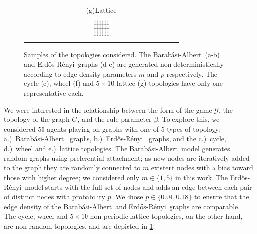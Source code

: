 \documentclass[letterpaper]{article}
\newcommand{\BA}{Barab\'{a}si-Albert~}
\newcommand{\BAbox}{\mbox{\BA}}
\newcommand{\ER}{Erd\H{o}s-R\'{e}nyi~}
\newcommand{\ERbox}{\mbox{\ER}}
\begin{document}
\begin{figure}[!h]
\begin{tabular}{ccc}
        \multicolumn{3}{c}{\footnotesize (g)\quad Lattice} \\
        \multicolumn{3}{c}{\includegraphics[width=0.14\textwidth]{"topologies/lattice"}} \\
    \end{tabular}
    \caption{\label{fig:topologies}
    Samples of the topologies considered. The \BA (a-b) and \ER graphs (d-e) are generated non-deterministically according to edge density parameters $m$ and $p$ respectively. The cycle (c), wheel (f) and $5 \times 10$ lattice (g) topologies have only one representative each. \\}
\end{figure}

We were interested in the relationship between the form of the game $\mathcal{G}$, the topology of the graph $G$, and the rule parameter $\beta$. To explore this, we considered $50$ agents playing on graphs with one of 5 types of topology: \mbox{a.) \BAbox} graphs, \mbox{b.) \ERbox} graphs, and the \mbox{c.) cycle}, \mbox{d.) wheel} and \mbox{e.) lattice} topologies. The \BAbox model \citep{Barabasi1999-lx} generates random graphs using preferential attachment; as new nodes are iteratively added to the graph they are randomly connected to $m$ existent nodes with a bias toward those with higher degree; we considered only $m\in\{1,5\}$ in this work. The \ERbox model \citep{Erdos1959-bd} starts with the full set of nodes and adds an edge between each pair of distinct nodes with probability $p$. We chose $p\in\{0.04,0.18\}$ to ensure that the edge density of the \BAbox and \ERbox graphs are comparable. The cycle, wheel and $5 \times 10$ non-periodic lattice topologies, on the other hand, are non-random topologies, and are depicted in \ref{fig:topologies}.
\end{document}
